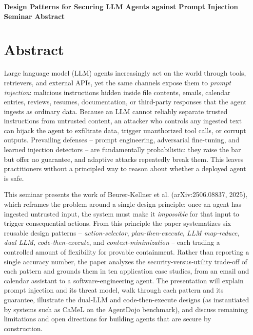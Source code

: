 \documentclass[11pt]{article}
\begin{document}
\begin{center}
{\LARGE\bfseries Design Patterns for Securing LLM Agents against Prompt Injection}\\[1.1em]
{\large\bfseries Seminar Abstract}\\[0.6em]
{\normalsize \seminarDate}
\end{center}
\vspace{0.6em}
\section*{Abstract}
Large language model (LLM) agents increasingly act on the world through tools, retrievers, and external APIs, yet the same channels expose them to \emph{prompt injection}: malicious instructions hidden inside file contents, emails, calendar entries, reviews, resumes, documentation, or third-party responses that the agent ingests as ordinary data. Because an LLM cannot reliably separate trusted instructions from untrusted content, an attacker who controls any ingested text can hijack the agent to exfiltrate data, trigger unauthorized tool calls, or corrupt outputs. Prevailing defenses -- prompt engineering, adversarial fine-tuning, and learned injection detectors -- are fundamentally probabilistic: they raise the bar but offer no guarantee, and adaptive attacks repeatedly break them. This leaves practitioners without a principled way to reason about whether a deployed agent is safe.

This seminar presents the work of Beurer-Kellner et al. (arXiv:2506.08837, 2025), which reframes the problem around a single design principle: once an agent has ingested untrusted input, the system must make it \emph{impossible} for that input to trigger consequential actions. From this principle the paper systematizes six reusable design patterns -- \emph{action-selector}, \emph{plan-then-execute}, \emph{LLM map-reduce}, \emph{dual LLM}, \emph{code-then-execute}, and \emph{context-minimization} -- each trading a controlled amount of flexibility for provable containment. Rather than reporting a single accuracy number, the paper analyzes the security-versus-utility trade-off of each pattern and grounds them in ten application case studies, from an email and calendar assistant to a software-engineering agent. The presentation will explain prompt injection and its threat model, walk through each pattern and its guarantee, illustrate the dual-LLM and code-then-execute designs (as instantiated by systems such as CaMeL on the AgentDojo benchmark), and discuss remaining limitations and open directions for building agents that are secure by construction.
\end{document}
